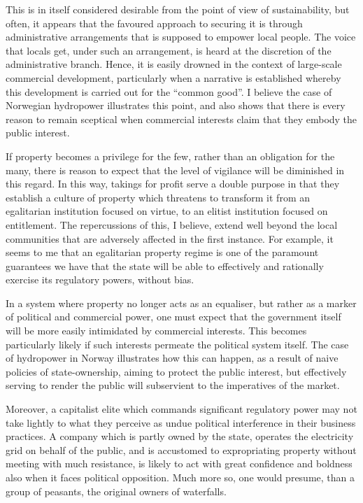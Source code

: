 {{This is in itself considered desirable from the point of view of sustainability, but often, it appears that the favoured approach to securing it is through administrative arrangements that is supposed to empower local people. The voice that locals get, under such an arrangement, is heard at the discretion of the administrative branch. Hence, it is easily drowned in the context of large-scale commercial development, particularly when a narrative is established whereby this development is carried out for the ``common good''. I believe the case of Norwegian hydropower illustrates this point, and also shows that there is every reason to remain sceptical when commercial interests claim that they embody the public interest.

If property becomes a privilege for the few, rather than an obligation for the many, there is reason to expect that the level of vigilance will be diminished in this regard. In this way, takings for profit serve a double purpose in that they establish a culture of property which threatens to transform it from an egalitarian institution focused on virtue, to an elitist institution focused on entitlement.
The repercussions of this, I believe, extend well beyond the local communities that are adversely affected in the first instance. For example, it seems to me that an egalitarian property regime is one of the paramount guarantees we have that the state will be able to effectively and rationally exercise its regulatory powers, without bias. 

In a system where property no longer acts as an equaliser, but rather as a marker of political and commercial power, one must expect that the government itself will be more easily intimidated by commercial interests. This becomes particularly likely if such interests permeate the political system itself. The case of hydropower in Norway illustrates how this can happen, as a result of naive policies of state-ownership, aiming to protect the public interest, but effectively serving to render the public will subservient to the imperatives of the market. 

Moreover, a capitalist elite which commands significant regulatory power may not take lightly to what they perceive as undue political interference in their business practices. A company which is partly owned by the state, operates the electricity grid on behalf of the public, and is accustomed to expropriating property without meeting with much resistance, is likely to act with great confidence and boldness also when it faces political opposition. Much more so, one would presume, than a group of peasants, the original owners of waterfalls.

}}
